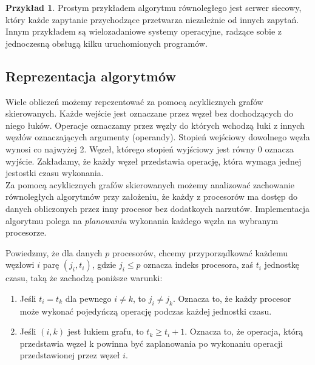 \documentclass[a4paper,oneside,leqno,12pt]{book}
\theoremstyle{definition}
\newtheorem{przyklad}{Przykład}[chapter]
\newtheorem{definicja}{Definicja}[chapter]
\theoremstyle{plain}
\theoremstyle{remark}
\begin{document}
\begin{przyklad}
Prostym przykładem algorytmu równoległego jest serwer siecowy, który każde zapytanie przychodzące przetwarza niezależnie od innych zapytań. Innym przykładem są wielozadaniowe systemy operacyjne, radzące sobie z jednoczesną obsługą kilku uruchomionych programów.
\end{przyklad}
%
%
%
%

\subsection{Reprezentacja algorytmów}


Wiele obliczeń możemy repezentować za pomocą acyklicznych grafów skierowanych. Każde wejście jest oznaczane przez węzeł bez dochodzących do niego łuków. Operacje oznaczamy przez węzły do których wchodzą łuki z innych węzłów oznaczających argumenty (operandy). Stopień wejściowy dowolnego węzła wynosi co najwyżej 2. Węzeł, którego stopień wyjściowy jest równy 0 oznacza wyjście. Zakładamy, że każdy węzeł przedstawia operację, która wymaga jednej jestostki czasu wykonania.\\



Za pomocą acyklicznych grafów skierowanych możemy analizować zachowanie równoległych algorytmów przy założeniu, że każdy z procesorów ma dostęp do danych obliczonych przez inny procesor bez dodatkoych narzutów. Implementacja algorytmu polega na \emph{planowaniu} wykonania każdego węzła na wybranym procesorze.

Powiedzmy, że dla danych \(p\) procesorów, chcemy przyporządkować każdemu węzłowi \(i\) parę \((j_i, t_i)\), gdzie \(j_i \leq p\) oznacza indeks procesora, zaś \(t_i\) jednostkę czasu, taką że zachodzą poniższe warunki:
\begin{enumerate}
\item Jeśli \(t_i=t_k\) dla pewnego \(i\neq k\), to \(j_i\neq j_k\). Oznacza to, że każdy procesor może wykonać pojedyńczą operację podczas każdej jednostki czasu.
\item Jeśli \((i, k)\) jest łukiem grafu, to \(t_k\geq t_i + 1\). Oznacza to, że operacja, którą przedstawia węzeł k powinna być zaplanowania po wykonaniu operacji przedstawionej przez węzeł \(i\).
\end{enumerate}
\end{document}
